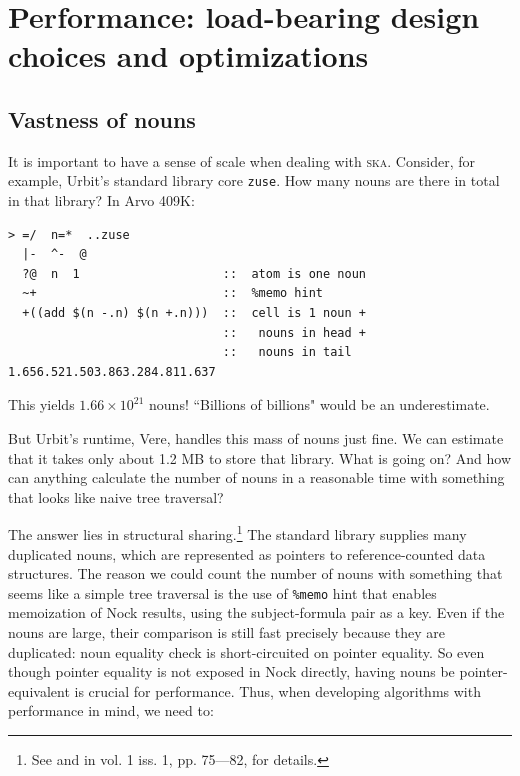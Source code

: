 \documentclass[twoside]{article}
\begin{document}
\section{Performance: load-bearing design choices and optimizations}

\subsection{Vastness of nouns}

It is important to have a sense of scale when dealing with \textsc{ska}.  Consider, for example, Urbit's standard library core \lstinline[style=inlinecode]{zuse}.  How many nouns are there in total in that library?  In Arvo 409K:

\begin{lstlisting}[style=listingblock]
> =/  n=*  ..zuse
  |-  ^-  @
  ?@  n  1                    ::  atom is one noun
  ~+                          ::  %memo hint
  +((add $(n -.n) $(n +.n)))  ::  cell is 1 noun +
                              ::   nouns in head +
                              ::   nouns in tail
1.656.521.503.863.284.811.637
\end{lstlisting}

\noindent
This yields $1.66 \times 10^{21}$ nouns!  ``Billions of billions" would be an underestimate.

But Urbit's runtime, Vere, handles this mass of nouns just fine.  We can estimate that it takes only about 1.2 MB to store that library.  What is going on? And how can anything calculate the number of nouns in a reasonable time with something that looks like naive tree traversal?

The answer lies in structural sharing.\footnote{See  and  in  vol. 1 iss. 1, pp. 75—82, for details.}  The standard library supplies many duplicated nouns, which are represented as pointers to reference-counted data structures. The reason we could count the number of nouns with something that seems like a simple tree traversal is the use of \lstinline[style=inlinecode]{%memo} hint that enables memoization of Nock results, using the subject-formula pair as a key.  Even if the nouns are large, their comparison is still fast precisely because they are duplicated: noun equality check is short-circuited on pointer equality.  So even though pointer equality is not exposed in Nock directly, having nouns be pointer-equivalent is crucial for performance.  Thus, when developing algorithms with performance in mind, we need to:
\end{document}
